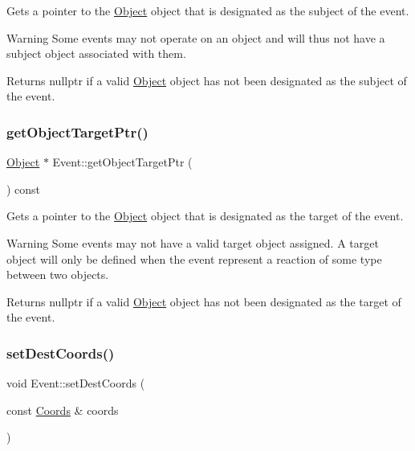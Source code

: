 Gets a pointer to the \hyperlink{class_object}{Object} object that is designated as the subject of the event. 

\begin{DoxyWarning}{Warning}
Some events may not operate on an object and will thus not have a subject object associated with them. 
\end{DoxyWarning}
\begin{DoxyReturn}{Returns}
nullptr if a valid \hyperlink{class_object}{Object} object has not been designated as the subject of the event. 
\end{DoxyReturn}
\mbox{\label{class_event_ab86f724c3c894faa1d6ccca78c357d24}} 
\subsubsection{\texorpdfstring{get\+Object\+Target\+Ptr()}{getObjectTargetPtr()}}
{\footnotesize\ttfamily \hyperlink{class_object}{Object} $\ast$ Event\+::get\+Object\+Target\+Ptr (\begin{DoxyParamCaption}{ }\end{DoxyParamCaption}) const}



Gets a pointer to the \hyperlink{class_object}{Object} object that is designated as the target of the event. 

\begin{DoxyWarning}{Warning}
Some events may not have a valid target object assigned. A target object will only be defined when the event represent a reaction of some type between two objects. 
\end{DoxyWarning}
\begin{DoxyReturn}{Returns}
nullptr if a valid \hyperlink{class_object}{Object} object has not been designated as the target of the event. 
\end{DoxyReturn}
\mbox{\label{class_event_a166ae40f2bf26c1e08097697ca76c884}} 
\subsubsection{\texorpdfstring{set\+Dest\+Coords()}{setDestCoords()}}
{\footnotesize\ttfamily void Event\+::set\+Dest\+Coords (\begin{DoxyParamCaption}\item[{const \hyperlink{struct_coords}{Coords} \&}]{coords }\end{DoxyParamCaption})}



